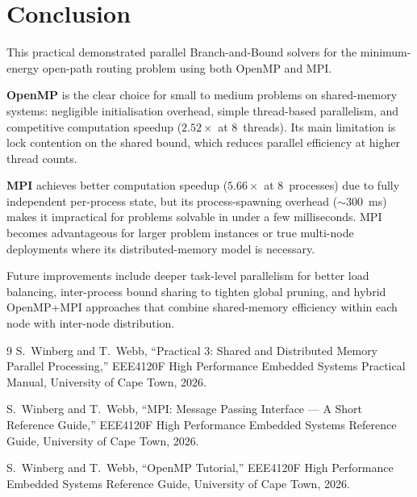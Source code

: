 \documentclass[conference]{IEEEtran}
\begin{document}
\section{Conclusion}

This practical demonstrated parallel Branch-and-Bound solvers for the
minimum-energy open-path routing problem using both OpenMP and MPI.

\textbf{OpenMP} is the clear choice for small to medium problems on
shared-memory systems: negligible initialisation overhead, simple
thread-based parallelism, and competitive computation speedup
($2.52\times$ at 8~threads). Its main limitation is lock contention on the
shared bound, which reduces parallel efficiency at higher thread counts.

\textbf{MPI} achieves better computation speedup ($5.66\times$ at
8~processes) due to fully independent per-process state, but its
process-spawning overhead (${\sim}300$~ms) makes it impractical for
problems solvable in under a few milliseconds. MPI becomes advantageous for
larger problem instances or true multi-node deployments where its
distributed-memory model is necessary.

Future improvements include deeper task-level parallelism for better load
balancing, inter-process bound sharing to tighten global pruning, and
hybrid OpenMP+MPI approaches that combine shared-memory efficiency within
each node with inter-node distribution.

\begin{thebibliography}{9}
S.~Winberg and T.~Webb, ``Practical 3: Shared and Distributed Memory
Parallel Processing,'' EEE4120F High Performance Embedded Systems
Practical Manual, University of Cape Town, 2026.

S.~Winberg and T.~Webb, ``MPI: Message Passing Interface --- A Short
Reference Guide,'' EEE4120F High Performance Embedded Systems
Reference Guide, University of Cape Town, 2026.

S.~Winberg and T.~Webb, ``OpenMP Tutorial,'' EEE4120F High Performance
Embedded Systems Reference Guide, University of Cape Town, 2026.
\end{thebibliography}
\end{document}
